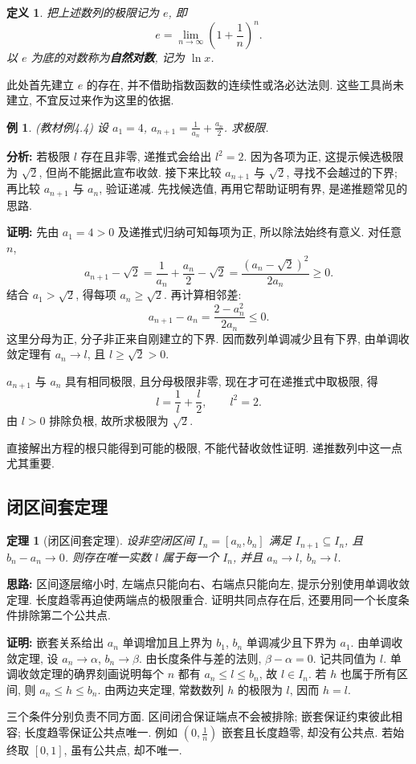 \documentclass[UTF8,openany]{ctexbook}
\theoremstyle{chinesetextbook}
\newtheorem{definition}{定义}[section]
\newtheorem{example}{例}[section]
\newtheorem{theorem}{定理}[section]
\newenvironment{cnproof}{\par\indent\textbf{证明:} \ignorespaces}{\par}
\begin{document}
\begin{definition}
把上述数列的极限记为 $e$, 即
\[
e=\lim_{n\to\infty}\left(1+\frac1n\right)^n.
\]
以 $e$ 为底的对数称为\textbf{自然对数}, 记为 $\ln x$.
\end{definition}
此处首先建立 $e$ 的存在, 并不借助指数函数的连续性或洛必达法则. 这些工具尚未建立, 不宜反过来作为这里的依据.
\begin{example}
(教材例4.4) 设 $a_1=4$, $\displaystyle a_{n+1}=\frac1{a_n}+\frac{a_n}{2}$. 求极限.
\end{example}
\par\indent\textbf{分析:} 若极限 $l$ 存在且非零, 递推式会给出 $l^2=2$. 因为各项为正, 这提示候选极限为 $\sqrt2$, 但尚不能据此宣布收敛. 接下来比较 $a_{n+1}$ 与 $\sqrt2$, 寻找不会越过的下界; 再比较 $a_{n+1}$ 与 $a_n$, 验证递减. 先找候选值, 再用它帮助证明有界, 是递推题常见的思路.
\begin{cnproof}
先由 $a_1=4>0$ 及递推式归纳可知每项为正, 所以除法始终有意义. 对任意 $n$,
\[
a_{n+1}-\sqrt2
=\frac1{a_n}+\frac{a_n}2-\sqrt2
=\frac{(a_n-\sqrt2)^2}{2a_n}\ge0.
\]
结合 $a_1>\sqrt2$, 得每项 $a_n\ge\sqrt2$. 再计算相邻差:
\[
a_{n+1}-a_n=\frac{2-a_n^2}{2a_n}\le0.
\]
这里分母为正, 分子非正来自刚建立的下界. 因而数列单调减少且有下界, 由单调收敛定理有 $a_n\to l$, 且 $l\ge\sqrt2>0$.

$a_{n+1}$ 与 $a_n$ 具有相同极限, 且分母极限非零, 现在才可在递推式中取极限, 得
\[
l=\frac1l+\frac l2,\qquad l^2=2.
\]
由 $l>0$ 排除负根, 故所求极限为 $\sqrt2$.
\end{cnproof}
直接解出方程的根只能得到可能的极限, 不能代替收敛性证明. 递推数列中这一点尤其重要.
\subsection{闭区间套定理}
\begin{theorem}[闭区间套定理]
设非空闭区间 $I_n=[a_n,b_n]$ 满足 $I_{n+1}\subseteq I_n$, 且 $b_n-a_n\to0$. 则存在唯一实数 $l$ 属于每一个 $I_n$, 并且 $a_n\to l$, $b_n\to l$.
\end{theorem}
\par\indent\textbf{思路:} 区间逐层缩小时, 左端点只能向右、右端点只能向左, 提示分别使用单调收敛定理. 长度趋零再迫使两端点的极限重合. 证明共同点存在后, 还要用同一个长度条件排除第二个公共点.

\begin{cnproof}
嵌套关系给出 $a_n$ 单调增加且上界为 $b_1$, $b_n$ 单调减少且下界为 $a_1$. 由单调收敛定理, 设 $a_n\to\alpha$, $b_n\to\beta$. 由长度条件与差的法则, $\beta-\alpha=0$. 记共同值为 $l$. 单调收敛定理的确界刻画说明每个 $n$ 都有 $a_n\le l\le b_n$, 故 $l\in I_n$.
若 $h$ 也属于所有区间, 则 $a_n\le h\le b_n$. 由两边夹定理, 常数数列 $h$ 的极限为 $l$, 因而 $h=l$.
\end{cnproof}
三个条件分别负责不同方面. 区间闭合保证端点不会被排除; 嵌套保证约束彼此相容; 长度趋零保证公共点唯一. 例如 $\displaystyle (0,\frac1n)$ 嵌套且长度趋零, 却没有公共点. 若始终取 $[0,1]$, 虽有公共点, 却不唯一.
\end{document}
